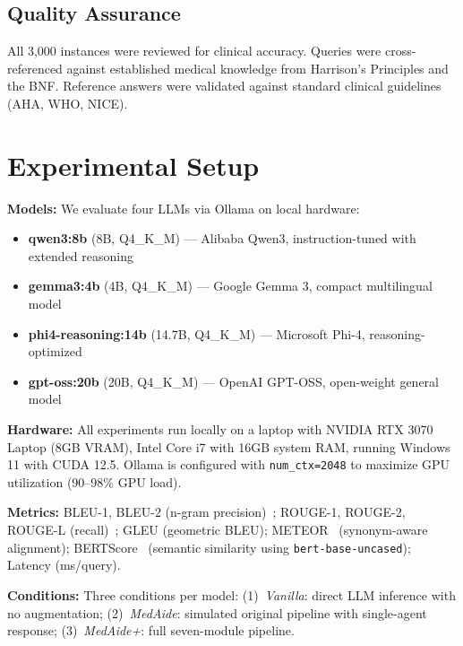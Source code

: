 \documentclass[conference]{IEEEtran}
\begin{document}
\subsection{Quality Assurance}
All 3,000 instances were reviewed for clinical accuracy. Queries were cross-referenced against established medical knowledge from Harrison's Principles and the BNF. Reference answers were validated against standard clinical guidelines (AHA, WHO, NICE).

\section{Experimental Setup}
\label{sec:setup}

\textbf{Models:} We evaluate four LLMs via Ollama on local hardware:
\begin{itemize}
    \item \textbf{qwen3:8b} (8B, Q4\_K\_M) — Alibaba Qwen3, instruction-tuned with extended reasoning
    \item \textbf{gemma3:4b} (4B, Q4\_K\_M) — Google Gemma 3, compact multilingual model
    \item \textbf{phi4-reasoning:14b} (14.7B, Q4\_K\_M) — Microsoft Phi-4, reasoning-optimized
    \item \textbf{gpt-oss:20b} (20B, Q4\_K\_M) — OpenAI GPT-OSS, open-weight general model
\end{itemize}

\textbf{Hardware:} All experiments run locally on a laptop with NVIDIA RTX 3070 Laptop (8GB VRAM), Intel Core i7 with 16GB system RAM, running Windows 11 with CUDA 12.5. Ollama is configured with \texttt{num\_ctx=2048} to maximize GPU utilization (90--98\% GPU load).

\textbf{Metrics:} BLEU-1, BLEU-2 (n-gram precision)~\cite{papineni2002bleu}; ROUGE-1, ROUGE-2, ROUGE-L (recall)~\cite{lin2004rouge}; GLEU (geometric BLEU); METEOR~\cite{banerjee2005meteor} (synonym-aware alignment); BERTScore~\cite{zhang2020bertscore} (semantic similarity using \texttt{bert-base-uncased}); Latency (ms/query).

\textbf{Conditions:} Three conditions per model: (1)~\textit{Vanilla}: direct LLM inference with no augmentation; (2)~\textit{MedAide}: simulated original pipeline with single-agent response; (3)~\textit{MedAide+}: full seven-module pipeline.
\end{document}
